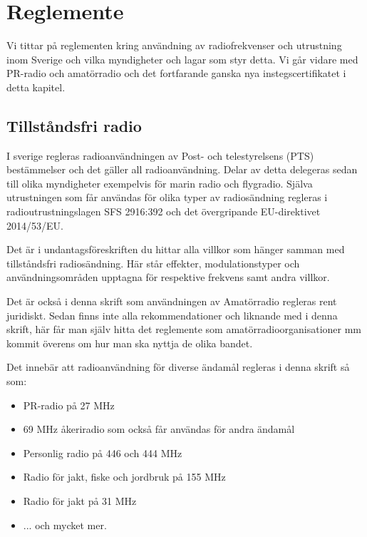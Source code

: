 \chapter{Reglemente}

Vi tittar på reglementen kring användning av radiofrekvenser och utrustning
inom Sverige och vilka myndigheter och lagar som styr detta. Vi går vidare med
PR-radio och amatörradio och det fortfarande ganska nya instegscertifikatet i
detta kapitel.

\clearpage

\section{Tillståndsfri radio}

I sverige regleras radioanvändningen av Post- och telestyrelsens (PTS)
bestämmelser och det gäller all radioanvändning. Delar av detta delegeras
sedan till olika myndigheter exempelvis för marin radio och flygradio. Själva
utrustningen som får användas för olika typer av radiosändning regleras i
radioutrustningslagen SFS 2916:392 och det övergripande EU-direktivet
2014/53/EU.


Det är i undantagsföreskriften du hittar alla villkor som hänger samman med
tillståndsfri radio\-sänd\-ning. Här står effekter, modulationstyper och
användningsområden upptagna för respektive frekvens samt andra villkor.

Det är också i denna skrift som användningen av Amatörradio regleras rent
juridiskt. Sedan finns inte alla rekommendationer och liknande med i denna
skrift, här får man själv hitta det reglemente som amatörradioorganisationer
mm kommit överens om hur man ska nyttja de olika bandet.

Det innebär att radioanvändning för diverse ändamål regleras i denna skrift så
som:

\begin{itemize}
 \item PR-radio på 27 MHz
 \item 69 MHz åkeriradio som också får användas för andra ändamål
 \item Personlig radio på 446 och 444 MHz
 \item Radio för jakt, fiske och jordbruk på 155 MHz
 \item Radio för jakt på 31 MHz
 \item ... och mycket mer.
\end{itemize}

